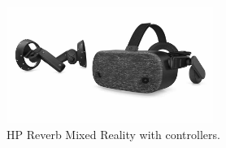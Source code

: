 \begin{figure}[!ht]
    \centering
    \includegraphics[width=0.6\textwidth]{./fig/background/hpReverbPro.jpg}
    \caption{HP Reverb Mixed Reality with controllers.}
    \label{fig:hpReverb}
\end{figure}


\cleardoublepage